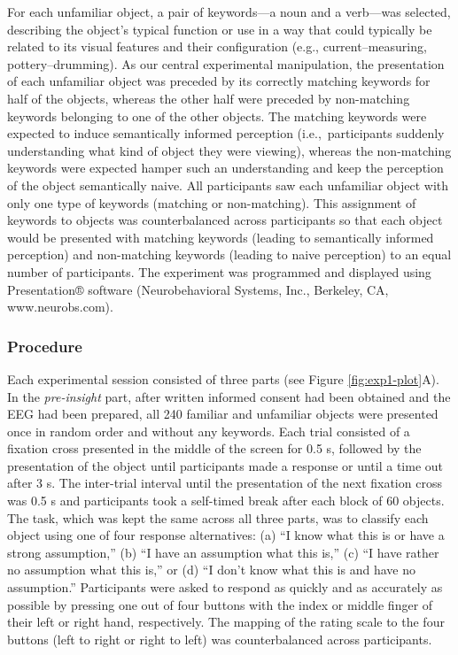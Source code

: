 \documentclass[
  english,
  man,floatsintext]{apa7}
\begin{document}
For each unfamiliar object, a pair of keywords---a noun and a verb---was selected, describing the object's typical function or use in a way that could typically be related to its visual features and their configuration (e.g., current--measuring, pottery--drumming). As our central experimental manipulation, the presentation of each unfamiliar object was preceded by its correctly matching keywords for half of the objects, whereas the other half were preceded by non-matching keywords belonging to one of the other objects. The matching keywords were expected to induce semantically informed perception (i.e.,~participants suddenly understanding what kind of object they were viewing), whereas the non-matching keywords were expected hamper such an understanding and keep the perception of the object semantically naive. All participants saw each unfamiliar object with only one type of keywords (matching or non-matching). This assignment of keywords to objects was counterbalanced across participants so that each object would be presented with matching keywords (leading to semantically informed perception) and non-matching keywords (leading to naive perception) to an equal number of participants. The experiment was programmed and displayed using Presentation® software (Neurobehavioral Systems, Inc., Berkeley, CA, www.neurobs.com).

\hypertarget{procedure}{%
\subsubsection{Procedure}\label{procedure}}

Each experimental session consisted of three parts (see Figure \ref{fig:exp1-plot}A). In the \emph{pre-insight} part, after written informed consent had been obtained and the EEG had been prepared, all 240 familiar and unfamiliar objects were presented once in random order and without any keywords. Each trial consisted of a fixation cross presented in the middle of the screen for 0.5 s, followed by the presentation of the object until participants made a response or until a time out after 3 s. The inter-trial interval until the presentation of the next fixation cross was 0.5 s and participants took a self-timed break after each block of 60 objects. The task, which was kept the same across all three parts, was to classify each object using one of four response alternatives: (a) \enquote{I know what this is or have a strong assumption,} (b) \enquote{I have an assumption what this is,} (c) \enquote{I have rather no assumption what this is,} or (d) \enquote{I don't know what this is and have no assumption.} Participants were asked to respond as quickly and as accurately as possible by pressing one out of four buttons with the index or middle finger of their left or right hand, respectively. The mapping of the rating scale to the four buttons (left to right or right to left) was counterbalanced across participants.
\end{document}
